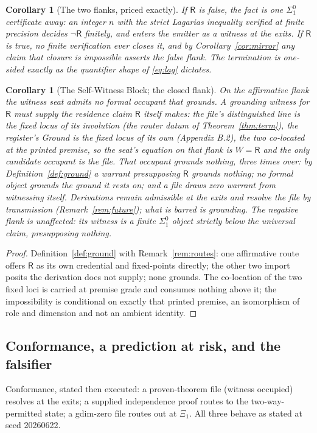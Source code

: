 \documentclass[twocolumn,10pt]{article}
\theoremstyle{plain}
\newtheorem{corollary}[theorem]{Corollary}
\theoremstyle{definition}
\newcommand{\R}{\mathsf{R}}
\begin{document}
\begin{corollary}[The two flanks, priced exactly]\label{cor:flanks}
If $\R$ is false, the fact is one $\Sigma^0_1$ certificate away: an integer $n$ with the strict Lagarias inequality verified at finite precision decides $\neg\R$ finitely, and enters the emitter as a witness at the exits. If $\R$ is true, no finite verification ever closes it, and by Corollary~\ref{cor:mirror} any claim that closure is impossible asserts the false flank. The termination is one-sided exactly as the quantifier shape of \eqref{eq:lag} dictates.
\end{corollary}

\begin{corollary}[The Self-Witness Block; the closed flank]\label{cor:selfwit}
On the affirmative flank the witness seat admits no formal occupant that grounds. A grounding witness for $\R$ must supply the residence claim $\R$ itself makes: the file's distinguished line is the fixed locus of its involution (the router datum of Theorem~\ref{thm:term}), the register's Ground is the fixed locus of its own (Appendix B.2), the two co-located at the printed premise, so the seat's equation on that flank is $W=\R$ and the only candidate occupant is the file. That occupant grounds nothing, three times over: by Definition~\ref{def:ground} a warrant presupposing $\R$ grounds nothing; no formal object grounds the ground it rests on; and a file draws zero warrant from witnessing itself. Derivations remain admissible at the exits and resolve the file by transmission (Remark~\ref{rem:future}); what is barred is grounding. The negative flank is unaffected: its witness is a finite $\Sigma^0_1$ object strictly below the universal claim, presupposing nothing.
\end{corollary}
\begin{proof}
Definition~\ref{def:ground} with Remark~\ref{rem:routes}: one affirmative route offers $\R$ as its own credential and fixed-points directly; the other two import posits the derivation does not supply; none grounds. The co-location of the two fixed loci is carried at premise grade and consumes nothing above it; the impossibility is conditional on exactly that printed premise, an isomorphism of role and dimension and not an ambient identity.
\end{proof}

\subsection{Conformance, a prediction at risk, and the falsifier}\label{sec:risk}
Conformance, stated then executed: a proven-theorem file (witness occupied) resolves at the exits; a supplied independence proof routes to the two-way-permitted state; a gdim-zero file routes out at $\Xi_1$. All three behave as stated at seed 20260622.
\end{document}
